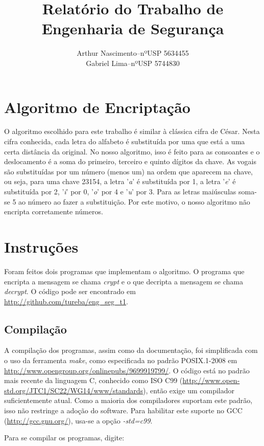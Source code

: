 \documentclass[12pt]{article}
\title{Relatório do Trabalho de\\Engenharia de Segurança\vspace{3cm}}
\author{
	\begin{tabular}{lcr}
		Arthur Nascimento & -- & nºUSP 5634455\\
		Gabriel Lima & -- & nºUSP 5744830\\
	\end{tabular}
}
\begin{document}
\maketitle
\pagebreak

\section{Algoritmo de Encriptação}

O algoritmo escolhido para este trabalho é similar à clássica cifra de César. Nesta cifra conhecida,
cada letra do alfabeto é substituída por uma que está a uma certa distância da original. No nosso algoritmo,
isso é feito para as consoantes e o deslocamento é a soma do primeiro, terceiro e quinto dígitos da chave.
As vogais são substituídas por um número (menos um) na ordem que aparecem na chave, ou seja, para uma chave
23154, a letra '\emph{a}' é substituída por 1, a letra '\emph{e}' é substituída por 2, '\emph{i}' por 0,
'\emph{o}' por 4 e '\emph{u}' por 3. Para as letras maiúsculas soma-se 5 ao número ao fazer a substituição.
Por este motivo, o nosso algoritmo não encripta corretamente números.

\section{Instruções}

Foram feitos dois programas que implementam o algoritmo. O programa que encripta a mensagem se chama \emph{crypt}
e o que decripta a mensagem se chama \emph{decrypt}. O código pode ser encontrado em
\url{http://github.com/tureba/eng\_seg\_t1}.

\subsection{Compilação}

A compilação dos programas, assim como da documentação, foi simplificada com o uso da ferramenta \emph{make},
como especificada no padrão {POSIX.1-2008} em \url{http://www.opengroup.org/onlinepubs/9699919799/}. O código
está no padrão mais recente da linguagem C, conhecido como ISO C99
(\url{http://www.open-std.org/JTC1/SC22/WG14/www/standards}), então exige um compilador suficientemente
atual. Como a maioria dos compiladores suportam este padrão, isso não restringe a adoção do software. Para
habilitar este suporte no GCC (\url{http://gcc.gnu.org/}), usa-se a opção \emph{-std=c99}.

Para se compilar os programas, digite:
\end{document}
